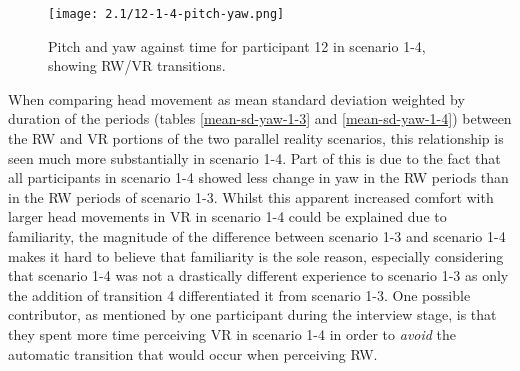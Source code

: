 \begin{figure}[h]
	\begin{center}
	\texttt{[image: 2.1/12-1-4-pitch-yaw.png]}
	\caption{Pitch and yaw against time for participant 12 in scenario 1-4, showing RW/VR transitions.}
	\label{12-1-4-pitch-yaw.png}
	\end{center}
\end{figure}

When comparing head movement as mean standard deviation weighted by duration of the periods (tables \ref{mean-sd-yaw-1-3} and \ref{mean-sd-yaw-1-4}) between the RW and VR portions of the two parallel reality scenarios, this relationship is seen much more substantially in scenario 1-4. Part of this is due to the fact that all participants in scenario 1-4 showed less change in yaw in the RW periods than in the RW periods of scenario 1-3. Whilst this apparent increased comfort with larger head movements in VR in scenario 1-4 could be explained due to familiarity, the magnitude of the difference between scenario 1-3 and scenario 1-4 makes it hard to believe that familiarity is the sole reason, especially considering that scenario 1-4 was not a drastically different experience to scenario 1-3 as only the addition of transition 4 differentiated it from scenario 1-3. One possible contributor, as mentioned by one participant during the interview stage, is that they spent more time perceiving VR in scenario 1-4 in order to \textit{avoid} the automatic transition that would occur when perceiving RW.

